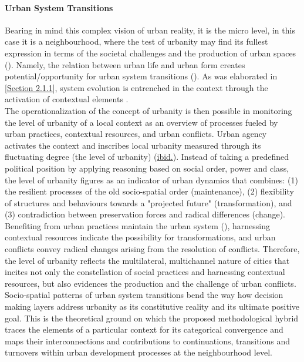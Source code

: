 \documentclass[11pt]{report}
\begin{document}
{{{{\paragraph{Urban System Transitions}

Bearing in mind this complex vision of urban reality, it is the micro level, in this case it is a neighbourhood, where the test of urbanity may find its fullest expression in terms of the societal challenges and the production of urban spaces (\href{Blotevogel}{\citealt{blotevogel_new_2008}}).
Namely, the relation between urban life and urban form creates potential/opportunity for urban system transitions (\href{Marcus}{\citealt{marcus_spatial_2007}}).
As was elaborated in [\href{Section 2.1.1}{Section 2.1.1}], system evolution is entrenched in the context through the activation of contextual elements .
\\

The operationalization of the concept of urbanity is then possible in monitoring the level of urbanity of a local context as an overview of processes fueled by urban practices, contextual resources, and urban conflicts.
Urban agency activates the context and inscribes local urbanity measured through its fluctuating degree (the level of urbanity) (\href{Marcus}{ibid.}).
Instead of taking a predefined political position by applying reasoning based on social order, power and class, the level of urbanity figures as an indicator of urban dynamics that combines:
(1) the resilient processes of the old socio-spatial order (maintenance),
(2) flexibility of structures and behaviours towards a "projected future" (transformation), and
(3) contradiction between preservation forces and radical differences (change).
Benefiting from urban practices maintain the urban system (\href{Taradin}{\citealt{tardin_landscape_2014}}), harnessing contextual resources indicate the possibility for transformations, and urban conflicts convey radical changes arising from the resolution of conflicts. Therefore, the level of urbanity reflects the multilateral, multichannel nature of cities that incites not only the constellation of social practices and harnessing contextual resources, but also evidences the production and the challenge of urban conflicts.
\\

Socio-spatial patterns of urban system transitions bend the way how decision making layers address urbanity as its constitutive reality and its ultimate positive goal.
This is the theoretical ground on which the proposed methodological hybrid traces the elements of a particular context for its categorical convergence and maps their interconnections and contributions to continuations, transitions and turnovers within urban development processes at the neighbourhood level. 
\\

}}}}
\end{document}
